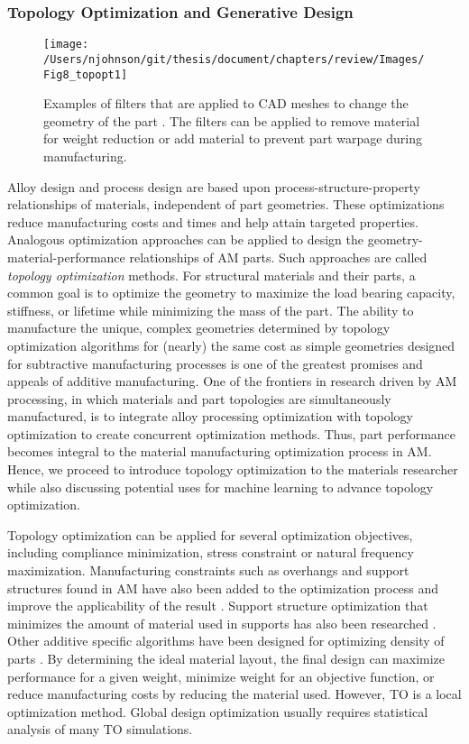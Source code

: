 
\subsubsection{Topology Optimization and Generative Design} \label{sec:topology optimization}

\begin{figure}
	\texttt{[image: /Users/njohnson/git/thesis/document/chapters/review/Images/Fig8\_topopt1]}
	\caption{Examples of filters that are applied to CAD meshes to change the geometry of the part \cite{Zegard2016}. The filters can be applied to remove material for weight reduction or add material to prevent part warpage during manufacturing.}
	\label{topfilter}
\end{figure}

Alloy design and process design are based upon process-structure-property relationships of materials, independent of part geometries. These optimizations reduce manufacturing costs and times and help attain targeted properties. Analogous optimization approaches can be applied to design the geometry-material-performance relationships of AM parts. Such approaches are called \textit{topology optimization} methods. For structural materials and their parts, a common goal is to optimize the geometry to maximize the load bearing capacity, stiffness, or lifetime while minimizing the mass of the part. The ability to manufacture the unique, complex geometries determined by topology optimization algorithms for (nearly) the same cost as simple geometries designed for subtractive manufacturing processes is one of the greatest promises and appeals of additive manufacturing.  One of the frontiers in research driven by AM processing, in which materials and part topologies are simultaneously manufactured, is to integrate alloy processing optimization with topology optimization to create concurrent optimization methods. Thus, part performance  becomes integral to the material manufacturing optimization process in AM. Hence, we proceed to introduce topology optimization to the materials researcher while also discussing potential uses for machine learning to advance topology optimization.

Topology optimization can be applied for several optimization objectives, including compliance minimization, stress constraint or natural frequency maximization. Manufacturing constraints such as overhangs and support structures found in AM have also been added to the optimization process and improve the applicability of the result \cite{Sigmund2013,Gaynor2016,Langelaar2016, Langelaar2017,Liu2018}. Support structure optimization that minimizes the amount of material used in supports has also been researched \cite{Huang2009, Vanek2014, Dumas2014}. Other additive specific algorithms have been designed for optimizing density of parts \cite{Zegard2016}. By determining the ideal material layout, the final design can maximize performance for a given weight, minimize weight for an objective function, or reduce manufacturing costs by reducing the material used. However, TO is a local optimization method. Global design optimization usually requires statistical analysis of many TO simulations. 

